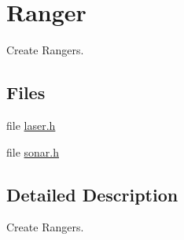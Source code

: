 \hypertarget{group__Ranger}{}\section{Ranger}
\label{group__Ranger}


Create Rangers.  


\subsection*{Files}
\begin{DoxyCompactItemize}
\item 
file \hyperlink{laser_8h}{laser.\+h}
\item 
file \hyperlink{sonar_8h}{sonar.\+h}
\end{DoxyCompactItemize}


\subsection{Detailed Description}
Create Rangers. 

